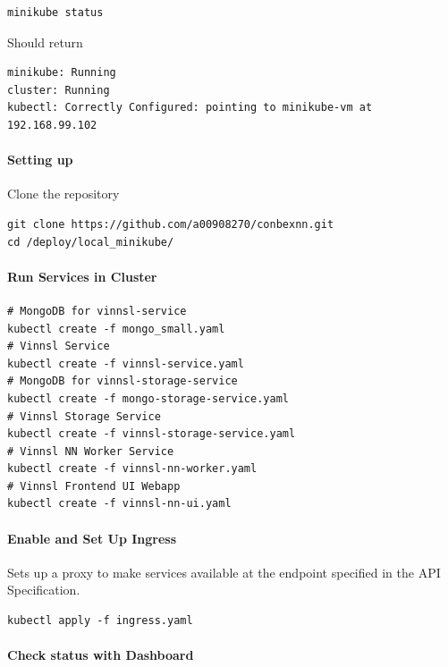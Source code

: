 \begin{verbatim}
minikube status
\end{verbatim}

Should return

\begin{verbatim}
minikube: Running
cluster: Running
kubectl: Correctly Configured: pointing to minikube-vm at 192.168.99.102
\end{verbatim}

\paragraph{Setting up}\label{setting-up}

Clone the repository

\begin{verbatim}
git clone https://github.com/a00908270/conbexnn.git
cd /deploy/local_minikube/
\end{verbatim}

\paragraph{Run Services in Cluster}\label{run-services-in-cluster}

\begin{verbatim}
# MongoDB for vinnsl-service
kubectl create -f mongo_small.yaml 
# Vinnsl Service
kubectl create -f vinnsl-service.yaml
# MongoDB for vinnsl-storage-service
kubectl create -f mongo-storage-service.yaml
# Vinnsl Storage Service
kubectl create -f vinnsl-storage-service.yaml
# Vinnsl NN Worker Service
kubectl create -f vinnsl-nn-worker.yaml
# Vinnsl Frontend UI Webapp
kubectl create -f vinnsl-nn-ui.yaml
\end{verbatim}

\paragraph{Enable and Set Up Ingress}\label{enable-and-set-up-ingress}

Sets up a proxy to make services available at the endpoint specified in
the API Specification.

\begin{verbatim}
kubectl apply -f ingress.yaml
\end{verbatim}

\paragraph{Check status with
Dashboard}\label{check-status-with-dashboard}

